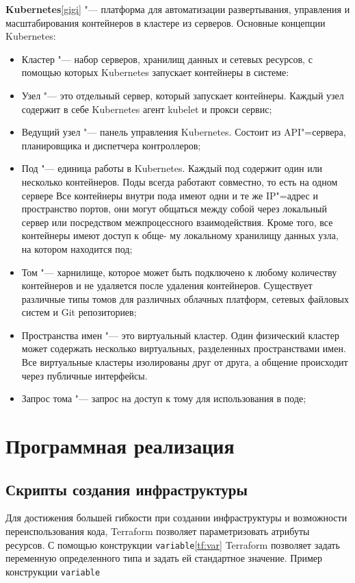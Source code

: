 \documentclass[bachelor, och, pract]{SCWorks}
\begin{document}
\textbf{Kubernetes}\ref{gigi} "--- платформа для автоматизации развертывания, управления и масштабирования контейнеров в кластере из серверов.
Основные концепции Kubernetes:
\begin{itemize}
	\item Кластер "--- набор серверов, хранилищ данных и сетевых ресурсов, с помощью которых Kubernetes запускает контейнеры в системе:
	\item Узел "--- это отдельный сервер, который запускает контейнеры. Каждый узел содержит в себе Kubernetes агент kubelet и прокси сервис;
	\item Ведущий узел "--- панель управления Kubernetes. Состоит из API"=сервера, планировщика и диспетчера контроллеров;
	\item Под "--- единица работы в Kubernetes. Каждый под содержит один или несколько контейнеров. Поды всегда работают совместно, то есть на одном сервере  Все контейнеры внутри пода имеют одни и те же IP"=адрес и пространство портов, они могут общаться между собой через локальный сервер или посредством межпроцессного взаимодействия. Кроме того, все контейнеры имеют доступ к обще- му локальному хранилищу данных узла, на котором находится под;
	\item Том "--- харнилище, которое может быть подключено к любому количеству контейнеров и не удаляется после удаления контейнеров. Существует различные типы томов для различных облачных платформ, сетевых файловых систем и Git репозиториев;
	\item Пространства имен "--- это виртуальный кластер. Один физический кластер может содержать несколько виртуальных, разделенных пространствами имен. Все виртуальные кластеры изолированы друг от друга, а общение происходит через публичные интерфейсы. 
	\item Запрос тома "--- запрос на доступ к тому для использования в поде;
\end{itemize}
\newpage

\section{Программная реализация}

\subsection{Скрипты создания инфраструктуры}
Для достижения большей гибкости при создании инфраструктуры и возможности переиспользования кода, Terraform позволяет параметризовать атрибуты ресурсов. С помощью конструкции \verb|variable|\ref{tf:var} Terraform позволяет задать переменную определенного типа и задать ей стандартное значение.
Пример конструкции \verb|variable|
\end{document}
